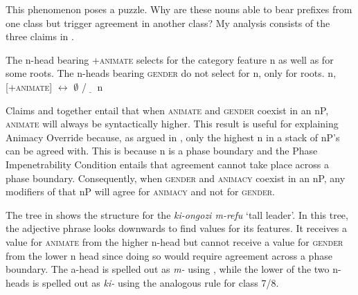 \documentclass[output=paper,newtxmath,modfonts,nonflat,hidelinks]{langsci/langscibook}
\begin{document}
 
 

 
This phenomenon poses a puzzle. Why are these nouns able to bear prefixes from one class but trigger agreement in another class?  My analysis consists of the three claims in .

\ea\label{ex:pesetsky:threeclaims} \ea\label{ex:pesetsky:claimone} The n-head bearing +\textsc{animate} selects for the category feature n as well as for some roots. 
\ex\label{ex:pesetsky:claimtwo} The n-heads bearing \textsc{gender} do not select for n, only for roots. 
\ex\label{ex:pesetsky:claimthree} n, [+\textsc{animate}] $\longleftrightarrow$ $\emptyset$ /$\underline{ \, \, \; \, }$ n \z \z 

Claims  and  together entail that when \textsc{animate} and \textsc{gender} coexist in an nP, \textsc{animate} will always be syntactically higher. This result is useful for explaining Animacy Override because, as argued in \citet{kramer15}, only the highest n in a stack of nP's can be agreed with. This is because n is a phase boundary and the Phase Impenetrability Condition entails that agreement cannot take place across a phase boundary. Consequently, when \textsc{gender} and \textsc{animacy} coexist in an nP, any modifiers of that nP will agree for \textsc{animacy} and not for \textsc{gender}.  

The tree in  shows the structure for the  \textit{ki-ongozi m-refu} `tall leader'. In this tree, the adjective phrase looks downwards to find values for its  features.  It receives a value for \textsc{animate} from the higher n-head but cannot receive a value for \textsc{gender} from the lower n head since doing so would require agreement across a phase boundary. The a-head is spelled out as \textit{m-} using , while the lower of the two n-heads is spelled out as \textit{ki-} using the analogous rule for class 7/8.
\end{document}
